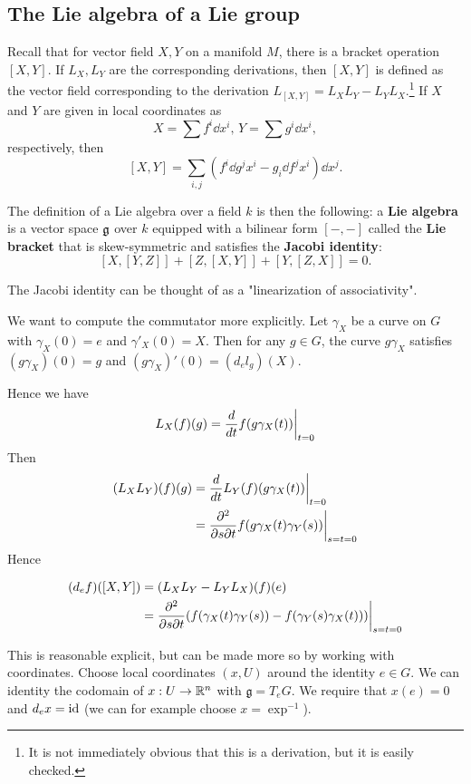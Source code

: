 \documentclass[11pt, english]{article}
\begin{document}
\subsection{The Lie algebra of a Lie group}

Recall that for vector field $X,Y$ on a manifold $M$, there is a bracket operation $[X,Y]$. If $L_X,L_Y$ are the corresponding derivations, then $[X,Y]$ is defined as the vector field corresponding to the derivation $L_{[X,Y]} = L_X L_Y - L_Y L_X$.\footnote{It is not immediately obvious that this is a derivation, but it is easily checked.} If $X$ and $Y$ are given in local coordinates as 
$$
X = \sum f^i \dd{}{x^i}, \, Y = \sum g^i \dd{}{x^i},
$$
respectively, then
$$
[X,Y] = \sum_{i,j} \left(f^i \dd{g^j}{x^i} - g_i \dd{f^j}{x^i} \right) \dd{}{x^j}.
$$

The definition of a Lie algebra over a field $k$ is then the following: a \textbf{Lie algebra} is a vector space $\mathfrak g$ over $k$ equipped with a bilinear form $[-,-]$ called the \textbf{Lie bracket} that is skew-symmetric and satisfies the \textbf{Jacobi identity}:
$$
[X,[Y,Z]] + [Z,[X,Y]] + [Y,[Z,X]] = 0.
$$

The Jacobi identity can be thought of as a "linearization of associativity". 

We want to compute the commutator more explicitly. Let $\gamma_X$ be a curve on $G$ with $\gamma_X(0)=e$ and $\gamma'_X(0)=X$. Then for any $g \in G$, the curve $g \gamma_X$ satisfies $(g \gamma_X)(0)=g$ and $(g \gamma_X)'(0) = (d_e l_g)(X)$. 

Hence we have 
$$
L_X(f)(g) =\restr{ \frac{d}{dt} f(g \gamma_X(t))}{t=0}
$$
Then
\begin{align*}
(L_XL_Y)(f)(g) &= \restr{\frac{d}{dt} L_Y(f) (g \gamma_X(t))}{t=0} \\
&= \restr{\frac{\partial^2}{\partial s \partial t} f(g \gamma_X(t) \gamma_Y(s))}{s=t=0}
\end{align*}
Hence

\begin{align}
(d_ef)([X,Y]) &= (L_X L_Y - L_Y L_X)(f)(e) \nonumber \\
&= \restr{
\frac{\partial^2}{\partial s \partial t} (f(\gamma_X(t)\gamma_Y(s))-f(\gamma_Y(s)\gamma_X(t)))}{s=t=0} \label{eqLie}
\end{align}

This is reasonable explicit, but can be made more so by working with coordinates. Choose local coordinates $(x,U)$ around the identity $e \in G$. We can identity the codomain of $x:U \to \mathbb{R}^n$ with $\mathfrak g=T_eG$. We require that $x(e)=0$ and $d_ex = \text{id}$ (we can for example choose $x = \exp^{-1}$). 
\end{document}
